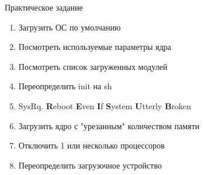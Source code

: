 \begin{frame}{Практическое задание}
	\begin{enumerate}
		\item Загрузить ОС по умолчанию
		\item Посмотреть используемые параметры ядра 
		\item Посмотреть список загруженных модулей
			\pause
		\item Переопределить init на sh
		\item SysRq. {\bf R}eboot {\bf E}ven {\bf I}f {\bf S}ystem {\bf U}tterly {\bf B}roken
			\pause
		\item Загрузить ядро с "урезанным" количеством памяти
		\item Отключить 1 или несколько процессоров
			\pause
		\item Переопределить загрузочное устройство
	\end{enumerate}
\end{frame}
